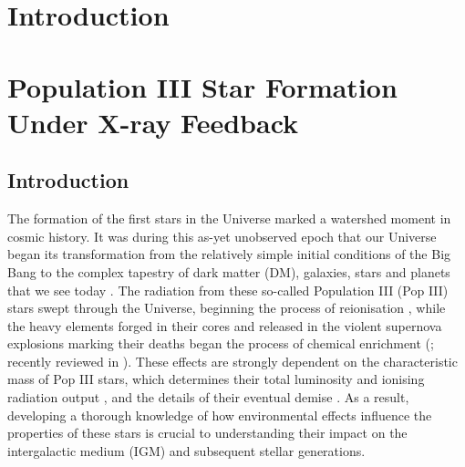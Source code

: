 \documentclass{thesis}
\begin{document}
\tableofcontents

\listoffigures

\mainmatter

\chapter{Introduction}

\chapter{Population III Star Formation Under X-ray Feedback}
\section{Introduction}
\label{intro}
The formation of the first stars in the Universe marked a watershed moment in cosmic history.  It was during this as-yet unobserved epoch that our Universe began its transformation from the relatively simple initial conditions of the Big Bang to the complex tapestry of dark matter (DM), galaxies, stars and planets that we see today \citep{BarkanaLoeb2001, Miralda-Escude2003, Brommetal2009, Loeb2010}.  The radiation from these so-called Population III (Pop III) stars swept through the Universe, beginning the process of reionisation \citep{Kitayamaetal2004, Sokasianetal2004, WhalenAbelNorman2004, AlvarezBrommShapiro2006, JohnsonGreifBromm2007, Robertsonetal2010}, while the heavy elements forged in their cores and released in the violent supernova explosions marking their deaths began the process of chemical enrichment (\citealt{MadauFerraraRees2001, MoriFerraraMadau2002, BrommYoshidaHernquist2003, Hegeretal2003, UmedaNomoto2003, TornatoreFerraraSchneider2007, Greifetal2007, Greifetal2010, WiseAbel2008, Maioetal2011}; recently reviewed in \citealt{KarlssonBrommHawthorn2013}). These effects are strongly dependent on the characteristic mass of Pop III stars, which determines their total luminosity and ionising radiation output \citep{Schaerer2002}, and the details of their eventual demise \citep{Hegeretal2003, HegerWoosley2010, MaederMeynet2012}. As a result, developing a thorough knowledge of how environmental effects influence the properties of these stars is crucial to understanding their impact on the intergalactic medium (IGM) and subsequent stellar generations.
\end{document}

